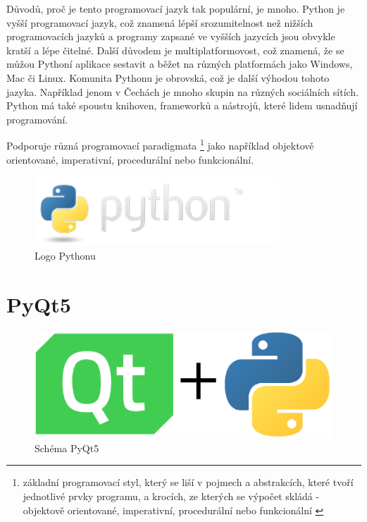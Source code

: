 Důvodů, proč je tento programovací jazyk tak populární, je mnoho. Python je vyšší programovací jazyk,
což znamená lépší srozumitelnost než nižších programovacích jazyků a programy zapsané
ve vyšších jazycích jsou obvykle kratší a lépe čitelné.  Další důvodem je multiplatformovost,
což znamená, že se můžou Pythoní aplikace sestavit a běžet na různých platformách jako 
Windows, Mac či Linux. Komunita Pythonu je obrovská, což je další výhodou tohoto jazyka.
Například jenom v Čechách je mnoho skupin na různých sociálních sítích.
Python má také spoustu knihoven, frameworků a nástrojů, které lidem usnadňují programování.

Podporuje různá programovací paradigmata
\footnote{základní programovací styl, který se liší v pojmech a abstrakcích,
které tvoří jednotlivé prvky programu, a krocích, ze kterých se výpočet skládá  
- objektově orientované, imperativní, procedurální nebo funkcionální \cite{wikipedia-paradigma}} 
jako například objektově orientované, imperativní, procedurální nebo funkcionální.

\begin{figure}[H] \centering
    \includegraphics[width=260pt]{./pictures/python-logo.png}
    \caption[Logo Pythonu]{Logo Pythonu \cite{python}}
	\label{fig:python-logo}                                
\end{figure} 

\section{PyQt5}

\begin{figure}[H] \centering
    \includegraphics[width=400pt]{./pictures/pyqt.png}
    \caption[Schéma PyQt5 Pythonu]{Schéma PyQt5}
	\label{fig:pyqt}                                
\end{figure} 